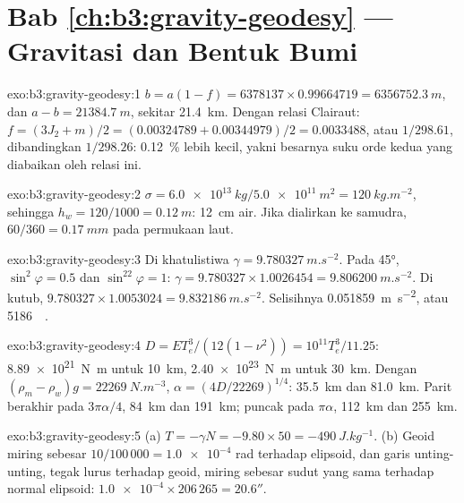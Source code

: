 \section*{Bab \ref{ch:b3:gravity-geodesy} --- Gravitasi dan Bentuk Bumi}

\begin{solution}{exo:b3:gravity-geodesy:1}
$b = a(1 - f) = 6378137\times0.99664719 = \qty{6356752.3}{m}$, dan
$a - b = \qty{21384.7}{m}$, sekitar \qty{21.4}{km}. Dengan relasi Clairaut:
$f = (3J_2 + m)/2 = (0.00324789 + 0.00344979)/2 = \num{0.0033488}$, atau
$1/298.61$, dibandingkan $1/298.26$: \qty{0.12}{\percent} lebih kecil, yakni besarnya
suku orde kedua yang diabaikan oleh relasi ini.
\end{solution}

\begin{solution}{exo:b3:gravity-geodesy:2}
$\sigma = \qty{6.0e13}{kg}/\qty{5.0e11}{m^2} = \qty{120}{kg.m^{-2}}$, sehingga
$h_w = 120/1000 = \qty{0.12}{m}$: \qty{12}{cm} air. Jika dialirkan ke
samudra, $60/360 = \qty{0.17}{mm}$ pada permukaan laut.
\end{solution}

\begin{solution}{exo:b3:gravity-geodesy:3}
Di khatulistiwa $\gamma = \qty{9.780327}{m.s^{-2}}$. Pada \ang{45},
$\sin^2\varphi = 0.5$ dan $\sin^22\varphi = 1$: $\gamma = 9.780327\times1.0026454
= \qty{9.806200}{m.s^{-2}}$. Di kutub, $9.780327\times1.0053024 =
\qty{9.832186}{m.s^{-2}}$. Selisihnya \qty{0.051859}{m.s^{-2}}, atau
\qty{5186}{\milli\gal}.
\end{solution}

\begin{solution}{exo:b3:gravity-geodesy:4}
$D = ET_e^3/(12(1 - \nu^2)) = 10^{11}T_e^3/11.25$: \qty{8.89e21}{N.m} untuk
\qty{10}{km}, \qty{2.40e23}{N.m} untuk \qty{30}{km}. Dengan $(\rho_m - \rho_w)g =
\qty{22269}{N.m^{-3}}$, $\alpha = (4D/22269)^{1/4}$: \qty{35.5}{km} dan
\qty{81.0}{km}. Parit berakhir pada $3\pi\alpha/4$, \qty{84}{km} dan \qty{191}{km};
puncak  pada $\pi\alpha$, \qty{112}{km} dan \qty{255}{km}.
\end{solution}

\begin{solution}{exo:b3:gravity-geodesy:5}
(a) $T = -\gamma N = -9.80\times50 = \qty{-490}{J.kg^{-1}}$. (b) Geoid miring
sebesar $10/100\,000 = \num{1.0e-4}$ rad terhadap elipsoid, dan garis
unting-unting, tegak lurus terhadap geoid, miring sebesar sudut yang sama terhadap normal elipsoid:
$\num{1.0e-4}\times206\,265 = 20.6''$.
\end{solution}

